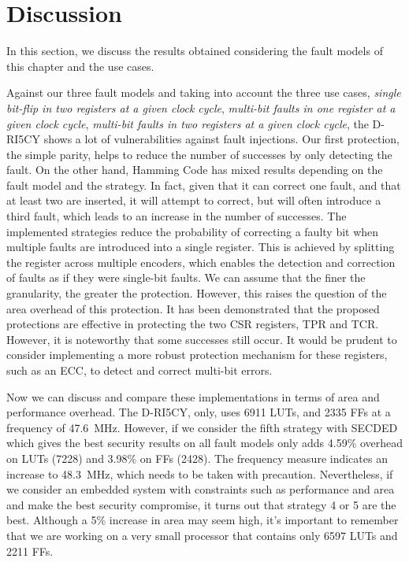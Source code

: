 \section{Discussion}
\label{section:chap6_discussion}

In this section, we discuss the results obtained considering the fault models of this chapter and the use cases.

Against our three fault models and taking into account the three use cases, \textit{single bit-flip in two registers at a given clock cycle}, \textit{multi-bit faults in one register at a given clock cycle}, \textit{multi-bit faults in two registers at a given clock cycle}, the D-RI5CY shows a lot of vulnerabilities against fault injections.
Our first protection, the simple parity, helps to reduce the number of successes by only detecting the fault. On the other hand, Hamming Code has mixed results depending on the fault model and the strategy. In fact, given that it can correct one fault, and that at least two are inserted, it will attempt to correct, but will often introduce a third fault, which leads to an increase in the number of successes. The implemented strategies reduce the probability of correcting a faulty bit when multiple faults are introduced into a single register. This is achieved by splitting the register across multiple encoders, which enables the detection and correction of faults as if they were single-bit faults. We can assume that the finer the granularity, the greater the protection. However, this raises the question of the area overhead of this protection. It has been demonstrated that the proposed protections are effective in protecting the two CSR registers, TPR and TCR. However, it is noteworthy that some successes still occur. It would be prudent to consider implementing a more robust protection mechanism for these registers, such as an ECC, to detect and correct multi-bit errors.

Now we can discuss and compare these implementations in terms of area and performance overhead. The D-RI5CY, only, uses 6911 LUTs, and 2335 FFs at a frequency of \SI{47.6}{\mega\hertz}. However, if we consider the fifth strategy with SECDED which gives the best security results on all fault models only adds 4.59\% overhead on LUTs (7228) and 3.98\% on FFs (2428). The frequency measure indicates an increase to \SI{48.3}{\mega\hertz}, which needs to be taken with precaution.
Nevertheless, if we consider an embedded system with constraints such as performance and area and make the best security compromise, it turns out that strategy 4 or 5 are the best. Although a 5\% increase in area may seem high, it's important to remember that we are working on a very small processor that contains only 6597 LUTs and 2211 FFs.

